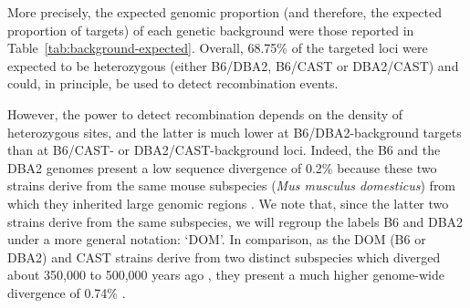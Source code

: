 %
%
%
%





	
More precisely, the expected genomic proportion (and therefore, the expected proportion of targets) of each genetic background were those reported in Table~\ref{tab:background-expected}.
Overall, 68.75\% of the targeted loci were expected to be heterozygous (either B6/DBA2, B6/CAST or DBA2/CAST) and could, in principle, be used to detect recombination events.

However, the power to detect recombination depends on the density of heterozygous sites, and the latter is much lower at B6/DBA2-background targets than at B6/CAST- or DBA2/CAST-background loci.
Indeed, the B6 and the DBA2 genomes present a low sequence divergence of 0.2\% \citep{keane2011mouse} because these two strains derive from the same mouse subspecies (\textit{Mus musculus domesticus}) from which they inherited large genomic regions \citep{davis2005genomewide}.
We note that, since the latter two strains derive from the same subspecies, we will regroup the labels B6 and DBA2 under a more general notation: ‘DOM’.
In comparison, as the DOM (B6 or DBA2) and CAST strains derive from two distinct subspecies which diverged about 350,000 to 500,000 years ago \citep{geraldes2008inferring}, they present a much higher genome-wide divergence of 0.74\% \citep{keane2011mouse}.

